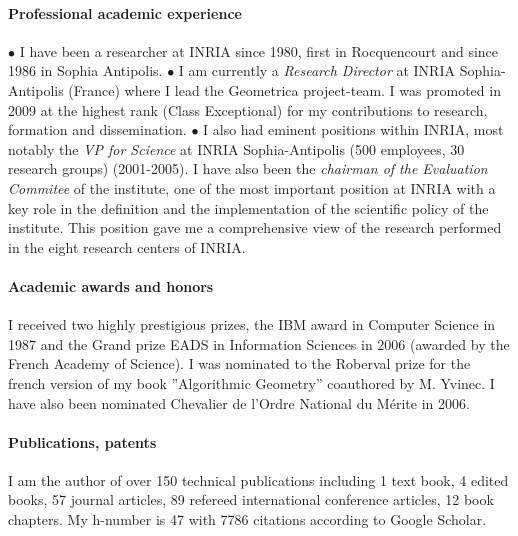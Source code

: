 \paragraph{Professional academic experience}\mbox{}

 $\bullet$ I have been a researcher at INRIA since 1980, first in Rocquencourt and since 1986 in Sophia Antipolis.  $\bullet$  I am currently a {\em Research Director} at INRIA Sophia-Antipolis (France) where I lead the Geometrica project-team. I was promoted in 2009 at the highest rank (Class Exceptional) for my contributions to research, formation and dissemination. $\bullet$ I also had eminent positions within INRIA, most notably  
the {\em VP for Science}  at INRIA Sophia-Antipolis (500 employees, 30 research groups) (2001-2005).
I have also been  the {\em chairman of the Evaluation Commitee} of the institute, one of the most important position at INRIA with a key role in the definition and the implementation
of the scientific policy of the institute.  This position gave me  a comprehensive view of the research performed in the eight research centers of INRIA.



\paragraph{Academic awards and honors}\mbox{}

I received two highly prestigious prizes, the IBM award in Computer Science  in 1987
and the Grand prize EADS in Information Sciences in 2006 (awarded by the French Academy of Science).  I was nominated to the Roberval prize for the french version of my book ”Algorithmic Geometry” coauthored by M. Yvinec. I have also been nominated Chevalier de l'Ordre National du M\'erite in 2006.

\paragraph{Publications, patents} \mbox{}

I am the author of over 150 technical publications including 1 text book, 4 edited books, 57 journal articles, 89 refereed international conference articles, 12 book chapters. My h-number is 47 with 7786 citations according to Google Scholar. 

